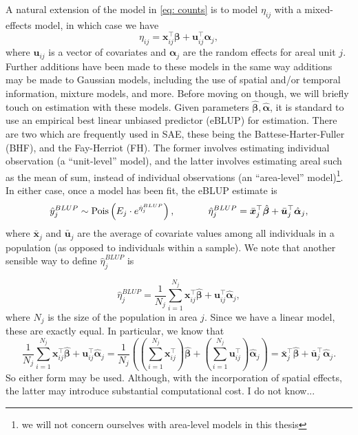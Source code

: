\documentclass[twoside,12pt,bibstyle=chem-acs]{reedthesis}
\begin{document}
A natural extension of the model in \autoref{eq: counts} is to model $\eta_{ij}$ with a mixed-effects model, in which case we have
\begin{equation*}
\eta_{ij} = \bm{x}_{ij}^\top \bm\beta + \bm{u}_{ij}^\top \bm\alpha_j,
\end{equation*}
where $\bm{u}_{ij}$ is a vector of covariates and $\bm\alpha_j$ are the random effects for areal unit $j$. Further additions have been made to these models in the same way additions may be made to Gaussian models, including the use of spatial and/or temporal information, mixture models, and more. Before moving on though, we will briefly touch on estimation with these models. Given parameters $\hat{\bm\beta}, \hat{\bm\alpha}$, it is standard to use an empirical best linear unbiased predictor (eBLUP) for estimation. There are two which are frequently used in SAE, these being the Battese-Harter-Fuller \cite{battese_error-components_1988} (BHF), and the Fay-Herriot \cite{fay_estimates_1979} (FH). The former involves estimating individual observation (a ``unit-level'' model), and the latter involves estimating areal such as the mean of sum, instead of individual observations (an ``area-level'' model)\footnote{we will not concern ourselves with area-level models in this thesis}. In either case, once a model has been fit, the eBLUP estimate is
\begin{equation}
\hat{y}_j^{BLUP} \sim \pois\left(E_{j} \cdot e^{\hat{\eta}_j^{BLUP}}\right), \hspace{0.1\linewidth} 
\hat\eta_j^{BLUP} = \bar{\bm{x}}_{j}^\top \hat{\bm\beta} + \bar{\bm{u}}_{j}^\top \hat{\bm\alpha}_j,
\end{equation}
where $\bar{\bm{x}}_{j}$ and $\bar{\bm{u}}_{j}$ are the average of covariate values among all individuals in a population (as opposed to individuals within a sample). We note that another sensible way to define $\hat{\eta}_j^{BLUP}$ is
\addtocounter{equation}{-1}
\begin{equation}
\hat{\eta}_j^{BLUP} = \frac{1}{N_j} \sum_{i=1}^{N_j} \bm{x}_{ij}^\top \hat{\bm\beta} + \bm{u}_{ij}^\top \hat{\bm{\alpha}}_j,
\end{equation}
where $N_j$ is the size of the population in area $j$. Since we have a linear model, these are exactly equal. In particular, we know that
\begin{equation*}
\frac{1}{N_j} \sum_{i=1}^{N_j} \bm{x}_{ij}^\top \hat{\bm\beta} + \bm{u}_{ij}^\top \hat{\bm{\alpha}}_j = \frac{1}{N_j}\left(\left(\sum_{i=1}^{N_j} \bm{x}_{ij}^\top\right) \hat{\bm\beta} + \left(\sum_{i=1}^{N_j} \bm{u}_{ij}^\top\right) \hat{\bm\alpha}_j\right) = \bar{\bm{x}}_{j}^\top \hat{\bm\beta} + \bar{\bm{u}}_{j}^\top \hat{\bm\alpha}_j.
\end{equation*}
So either form may be used. Although, with the incorporation of spatial effects, the latter may introduce substantial computational cost. I do not know...
\end{document}
